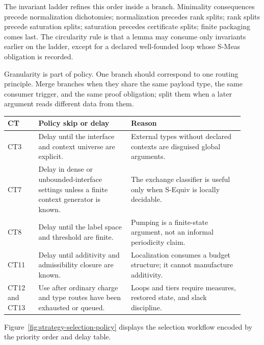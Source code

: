 \documentclass[
  11pt,
]{article}
\theoremstyle{definition}
\begin{document}
The invariant ladder refines this order inside a branch. Minimality
consequences precede normalization dichotomies; normalization precedes
rank splits; rank splits precede saturation splits; saturation precedes
certificate splits; finite packaging comes last. The circularity rule is
that a lemma may consume only invariants earlier on the ladder, except
for a declared well-founded loop whose S-Meas obligation is recorded.

Granularity is part of policy. One branch should correspond to one
routing principle. Merge branches when they share the same payload type,
the same consumer trigger, and the same proof obligation; split them
when a later argument reads different data from them.

\begingroup
\small
\setlength{\tabcolsep}{2pt}
\begin{longtable}[]{@{}
  >{\raggedright\arraybackslash}p{0.12\linewidth}
  >{\raggedright\arraybackslash}p{0.36\linewidth}
  >{\raggedright\arraybackslash}p{0.44\linewidth}@{}}
\toprule\noalign{}
CT & Policy skip or delay & Reason \\
\midrule\noalign{}
\endhead
\bottomrule\noalign{}
\endlastfoot
CT3 & Delay until the interface and context universe are explicit. & External types without declared contexts are disguised global arguments. \\
CT7 & Delay in dense or unbounded-interface settings unless a finite context generator is known. & The exchange classifier is useful only when S-Equiv is locally decidable. \\
CT8 & Delay until the label space and threshold are finite. & Pumping is a finite-state argument, not an informal periodicity claim. \\
CT11 & Delay until additivity and admissibility closure are known. & Localization consumes a budget structure; it cannot manufacture additivity. \\
CT12 and CT13 & Use after ordinary charge and type routes have been exhausted or queued. & Loops and tiers require measures, restored state, and slack discipline. \\
\end{longtable}
\endgroup

Figure~\ref{fig:strategy-selection-policy} displays the selection
workflow encoded by the priority order and delay table.
\end{document}
